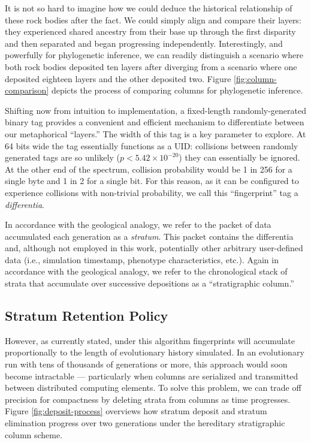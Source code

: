 It is not so hard to imagine how we could deduce the historical relationship of these rock bodies after the fact.
We could simply align and compare their layers: they experienced shared ancestry from their base up through the first disparity and then separated and began progressing independently.
Interestingly, and powerfully for phylogenetic inference, we can readily distinguish a scenario where both rock bodies deposited ten layers after diverging from a scenario where one deposited eighteen layers and the other deposited two.
Figure \ref{fig:column-comparison} depicts the process of comparing columns for phylogenetic inference.

Shifting now from intuition to implementation, a fixed-length randomly-generated binary tag provides a convenient and efficient mechanism to differentiate between our metaphorical ``layers.''
The width of this tag is a key parameter to explore.
At 64 bits wide the tag essentially functions as a UID: collisions between randomly generated tags are so unlikely ($p < 5.42\times10^{-20}$) they can essentially be ignored.
At the other end of the spectrum, collision probability would be 1 in 256 for a single byte and 1 in 2 for a single bit.
For this reason, as it can be configured to experience collisions with non-trivial probability, we call this ``fingerprint'' tag a \textit{differentia}.

In accordance with the geological analogy, we refer to the packet of data accumulated each generation as a \textit{stratum}.
This packet contains the differentia and, although not employed in this work, potentially other arbitrary user-defined data (i.e., simulation timestamp, phenotype characteristics, etc.).
Again in accordance with the geological analogy, we refer to the chronological stack of strata that accumulate over successive depositions as a ``stratigraphic column.''

\subsection{Stratum Retention Policy}



However, as currently stated, under this algorithm fingerprints will accumulate proportionally to the length of evolutionary history simulated.
In an evolutionary run with tens of thousands of generations or more, this approach would soon become intractable --- particularly when columns are serialized and transmitted between distributed computing elements.
To solve this problem, we can trade off precision for compactness by deleting strata from columns as time progresses.
Figure \ref{fig:deposit-process} overviews how stratum deposit and stratum elimination progress over two generations under the hereditary stratigraphic column scheme.

